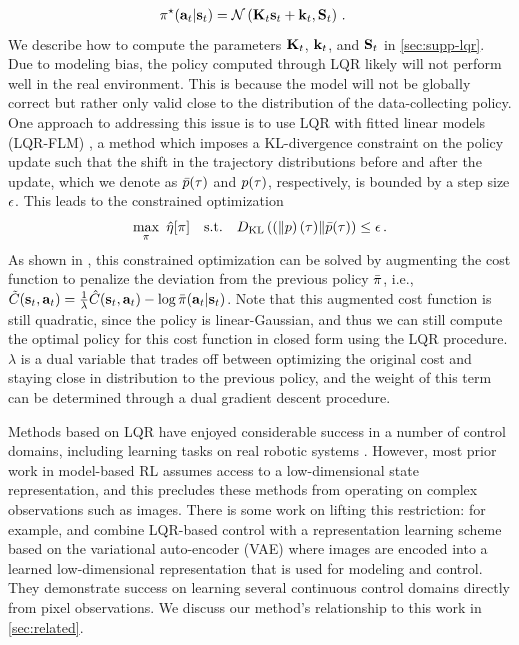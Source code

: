 \begin{align*}
    &\pi^\star(\mathbf{a}_t|\mathbf{s}_t)=\mathcal{N}\left(\mathbf{K}_t\mathbf{s}_t+\mathbf{k}_t,\mathbf{S}_t\right)\,.
\end{align*}
We describe how to compute the parameters $\mathbf{K}_t$, $\mathbf{k}_t$, and $\mathbf{S}_t$ in \autoref{sec:supp-lqr}. Due to modeling bias, the policy computed through LQR likely will not perform well in the real environment. This is because the model will not be globally correct but rather only valid close to the distribution of the data-collecting policy. One approach to addressing this issue is to use LQR with fitted linear models \mbox{(LQR-FLM)} \citep{mfcgps}, a method which imposes a KL-divergence constraint on the policy update such that the shift in the trajectory distributions before and after the update, which we denote as $\bar{p}(\tau)$ and $p(\tau)$, respectively, is bounded by a step size $\epsilon$. This leads to the constrained optimization
\begin{align}
    \max_\policy~\hat{\policyobj}[\policy]\text{\ \ \ s.t.\ \ \ }D_\KL(p(\traj)\|\bar{p}(\traj))\leq\polstepsize\,.\label{eq:lqrflm}
\end{align}
As shown in \citet{mfcgps}, this constrained optimization can be solved by augmenting the cost function to penalize the deviation from the previous policy $\bar{\pi}$, i.e., $\tilde{C}(\mathbf{s}_t,\mathbf{a}_t)=\frac{1}{\lambda}\hat{C}(\mathbf{s}_t,\mathbf{a}_t)-\log\bar{\pi}(\mathbf{a}_t|\mathbf{s}_t)$. Note that this augmented cost function is still quadratic, since the policy is linear-Gaussian, and thus we can still compute the optimal policy for this cost function in closed form using the LQR procedure. $\lambda$ is a dual variable that trades off between optimizing the original cost and staying close in distribution to the previous policy, and the weight of this term can be determined through a dual gradient descent procedure.

Methods based on LQR have enjoyed considerable success in a number of control domains, including learning tasks on real robotic systems \citep{ilqg,gps}. However, most prior work in model-based RL assumes access to a low-dimensional state representation, and this precludes these methods from operating on complex observations such as images. There is some work on lifting this restriction: for example, \citet{e2c} and \citet{rce} combine LQR-based control with a representation learning scheme based on the variational auto-encoder (VAE) \citep{Kingma2013, Rezende2014} where images are encoded into a learned low-dimensional representation that is used for modeling and control. They demonstrate success on learning several continuous control domains directly from pixel observations. We discuss our method's relationship to this work in \autoref{sec:related}.


